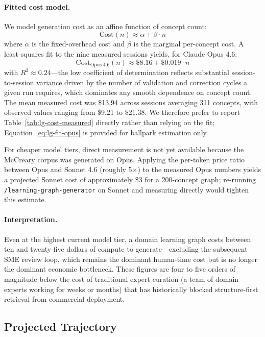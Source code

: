 \paragraph{Fitted cost model.}
We model generation cost as an affine function of concept count:
\begin{equation}\label{eq:lg-cost}
  \mathrm{Cost}(n) \approx \alpha + \beta \cdot n
\end{equation}
where $\alpha$ is the fixed-overhead cost and $\beta$ is the marginal
per-concept cost. A least-squares fit to the nine measured sessions
yields, for Claude Opus 4.6:
\begin{equation}\label{eq:lg-fit-opus}
  \mathrm{Cost}_{\mathrm{Opus\;4.6}}(n) \approx \$8.16 + \$0.019 \cdot n
\end{equation}
with $R^2 \approx 0.24$---the low coefficient of determination reflects
substantial session-to-session variance driven by the number of
validation and correction cycles a given run requires, which dominates
any smooth dependence on concept count. The mean measured cost was
\$13.94 across sessions averaging 311 concepts, with observed values
ranging from \$9.21 to \$21.38. We therefore prefer to report
Table~\ref{tab:lg-cost-measured} directly rather than relying on the
fit; Equation~\ref{eq:lg-fit-opus} is provided for
ballpark estimation only.

For cheaper model tiers, direct measurement is not yet available because
the McCreary corpus was generated on Opus. Applying the per-token price
ratio between Opus and Sonnet 4.6 (roughly 5$\times$) to the measured
Opus numbers yields a projected Sonnet cost of approximately \$3 for a
200-concept graph; re-running \texttt{/learning-graph-generator} on
Sonnet and measuring directly would tighten this estimate.

\paragraph{Interpretation.}
Even at the highest current model tier, a domain learning graph costs
between ten and twenty-five dollars of compute to generate---excluding
the subsequent SME review loop, which remains the dominant human-time
cost but is no longer the dominant economic bottleneck. These figures
are four to five orders of magnitude below the cost of traditional
expert curation (a team of domain experts working for weeks or months)
that has historically blocked structure-first retrieval from commercial
deployment.

\subsection{Projected Trajectory}\label{sec:lg-projection}

